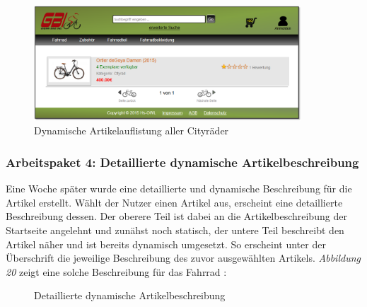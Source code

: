 \begin{figure}[H]
\begin{center}
\includegraphics[width=10cm]{Bilder/Abbildung10-DynamischeArtikelauflistungAllerCitybikes.png}
\end{center}
\caption{Dynamische Artikelauflistung aller Cityräder}
\label{Abbildung10-Dynamische Artikelauflistung aller Cityräder}
\end{figure}


\subsubsection{Arbeitspaket 4: Detaillierte dynamische Artikelbeschreibung}

Eine Woche später wurde eine detaillierte und dynamische Beschreibung für die Artikel erstellt. Wählt der Nutzer einen Artikel aus, erscheint eine detaillierte Beschreibung dessen. Der oberere Teil ist dabei an die Artikelbeschreibung der Startseite angelehnt und zunähst noch statisch, der untere Teil beschreibt den Artikel näher und ist bereits dynamisch umgesetzt. So erscheint unter der Überschrift \grqq{} die jeweilige Beschreibung des zuvor ausgewählten Artikels. \textit{Abbildung 20} zeigt eine solche Beschreibung für das Fahrrad \grqq{}:

\begin{figure}[H]
\begin{center}
\end{center}
\caption{Detaillierte dynamische Artikelbeschreibung}
\label{Abbildung11-Detaillierte dynamische Artikelbeschreibung}
\end{figure}

